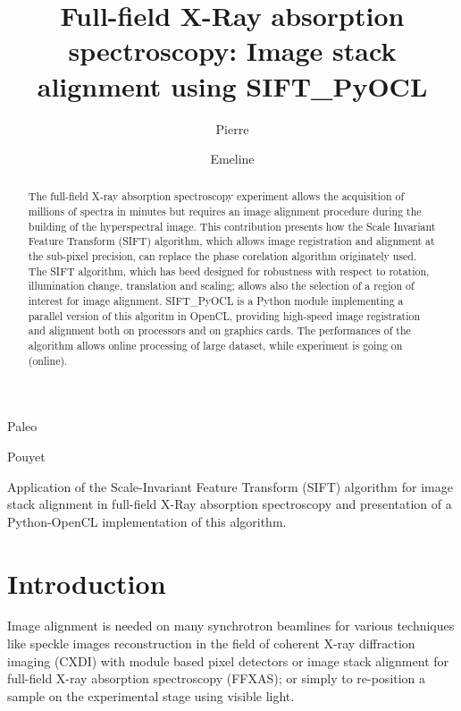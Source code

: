 \documentclass[preprint]{iucr}
\begin{document}
\title{Full-field X-Ray absorption spectroscopy: Image stack
alignment using SIFT\_PyOCL}

    \author[a]{Pierre}{Paleo}
    \author[a]{Emeline}{Pouyet}

\maketitle

\begin{synopsis}
Application of the Scale-Invariant Feature Transform (SIFT) algorithm for image
stack alignment in full-field X-Ray absorption spectroscopy and presentation of
a Python-OpenCL implementation of this algorithm.
\end{synopsis}

\begin{abstract}
The full-field X-ray absorption spectroscopy experiment allows the acquisition
of millions of spectra in minutes but requires an image alignment procedure during the
building of the hyperspectral image.
This contribution presents how the Scale Invariant Feature Transform (SIFT)
algorithm, which allows image registration and alignment at the sub-pixel
precision, can replace the phase corelation algorithm originately used.  
The SIFT algorithm, which has beed designed for robustness with respect to
rotation, illumination change, translation and scaling; allows also the
selection of a region of interest for image alignment.
SIFT\_PyOCL is a Python module implementing a parallel version of this algoritm
in OpenCL, providing high-speed image registration and alignment both on
processors and on graphics cards. The performances of the algorithm allows
online processing of large dataset, while experiment is going on (online).

\end{abstract}

\section{Introduction}

Image alignment is needed on many synchrotron beamlines for
various techniques like speckle images reconstruction in the field of coherent
X-ray diffraction imaging (CXDI) with module based pixel detectors or image
stack alignment for full-field X-ray absorption spectroscopy (FFXAS); or
simply to re-position a sample on the experimental stage using visible light.
\end{document}
